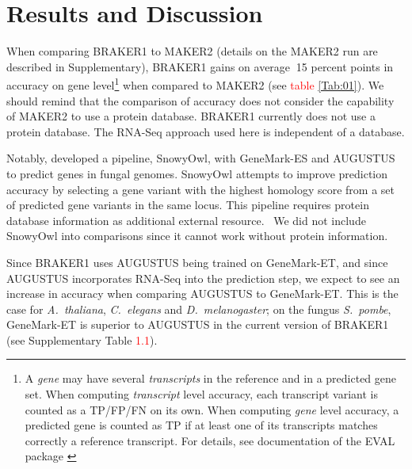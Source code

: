 \documentclass[a4paper,10pt]{article}
\begin{document}
\section{Results and Discussion}

When comparing BRAKER1 to MAKER2 (details on the MAKER2 run are described in Supplementary), BRAKER1 gains on average $~$15 percent points in accuracy on gene level\footnote{A \textit{gene} may have several \textit{transcripts} in the reference and in a predicted gene set. When computing \textit{transcript} level accuracy, each transcript variant is counted as a TP/FP/FN on its own. When computing \textit{gene} level accuracy, a predicted gene is counted as TP if at least one of its transcripts matches correctly a reference transcript. For details, see documentation of the EVAL package \citep{Eval}} when compared to MAKER2 (see \textcolor{red}{table \ref{Tab:01}}).
We should remind that the comparison of accuracy does not consider the capability of MAKER2 to use a protein database. BRAKER1 currently does not use a protein database. 
The RNA-Seq approach used here is independent of a database.

Notably, \citet{SnowyOwl} developed a pipeline, SnowyOwl, with GeneMark-ES \cite{GeneMark-ES} and AUGUSTUS to predict genes in fungal genomes. SnowyOwl attempts to improve prediction accuracy by selecting a gene variant with the highest homology score from a set of predicted gene variants in the same locus. This pipeline requires protein database information as additional external resource.  We did not include SnowyOwl into comparisons since it cannot work without protein information.%

Since BRAKER1 uses AUGUSTUS being trained on GeneMark-ET, and since AUGUSTUS incorporates RNA-Seq into the prediction step, we expect to see an increase in accuracy when comparing AUGUSTUS to GeneMark-ET. This is the case for \textit{A.~thaliana}, \textit{C.~elegans} and \textit{D.~melanogaster}; on the fungus \textit{S.~pombe}, GeneMark-ET is superior to AUGUSTUS in the current version of BRAKER1 (see Supplementary Table \textcolor{red}{1.1}). 
\end{document}

